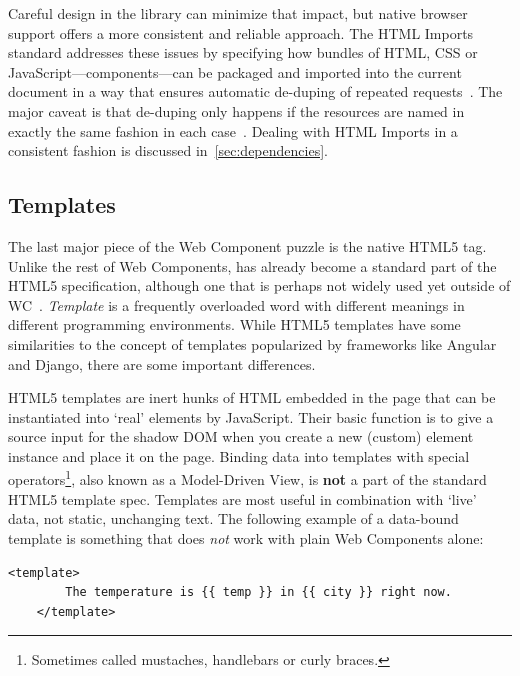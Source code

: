Careful design in the library can minimize that impact, but native browser support offers a more consistent and reliable approach.
The HTML Imports standard addresses these issues by specifying how bundles of HTML, 
CSS or JavaScript---components---can be packaged and imported into the current document in a way that ensures automatic de-duping of repeated requests~\cite{w3ccontributors2015-a}.
The major caveat is that de-duping only happens if the resources are named in exactly the same fashion in each case~\cite{bidelman2013}.
Dealing with HTML Imports in a consistent fashion is discussed in~\cref{sec:dependencies}.

\subsection{Templates}
The last major piece of the Web Component puzzle is the native HTML5  tag. 
Unlike the rest of Web Components,  has already become a standard part of the HTML5 specification, 
although one that is perhaps not widely used yet outside of WC~\cite{w3ccontributors2015-c}.
\textit{Template} is a frequently overloaded word with different meanings in different programming environments.
While HTML5 templates have some similarities to the concept of templates popularized by frameworks like Angular and Django, there are some important differences.

HTML5 templates are inert hunks of HTML embedded in the page that can be instantiated into `real' elements by JavaScript.
Their basic function is to give a source input for the shadow DOM when you create a new (custom) element instance and place it on the page.
Binding data into templates with special operators\footnote{
Sometimes called mustaches, handlebars or curly braces. },
also known as a Model-Driven View,
is \textbf{not} a part of the standard HTML5 template spec.
Templates are most useful in combination with `live' data, not static, unchanging text.
The following example of a data-bound template is something that does \textit{not} work with plain Web Components alone:

\begin{lstlisting}[language=HTML5,caption={An example of a data-bound template.},label=l:dbtemplate]
	<template> 
		The temperature is {{ temp }} in {{ city }} right now.
	</template>
\end{lstlisting}

